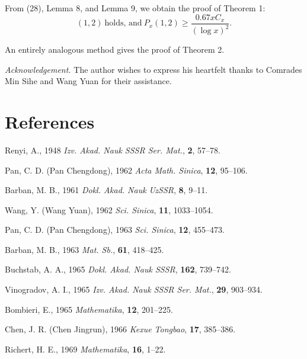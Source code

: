 From (28), Lemma 8, and Lemma 9, we obtain the proof of Theorem 1:
\[
(1,2)\ \text{holds, and}\ P_x(1,2)\geqslant\frac{0.67xC_x}{(\log x)^2}.
\]

An entirely analogous method gives the proof of Theorem 2.

\bigskip
\noindent\textit{Acknowledgement.} The author wishes to express his heartfelt thanks to Comrades Min Sihe and Wang Yuan for their assistance.

\section*{References}

\begin{enumerate}[leftmargin=2.5em,label={[\arabic*]}]
\item Renyi, A., 1948 \textit{Izv. Akad. Nauk SSSR Ser. Mat.}, \textbf{2}, 57--78.
\item Pan, C. D. (Pan Chengdong), 1962 \textit{Acta Math. Sinica}, \textbf{12}, 95--106.
\item Barban, M. B., 1961 \textit{Dokl. Akad. Nauk UzSSR}, \textbf{8}, 9--11.
\item Wang, Y. (Wang Yuan), 1962 \textit{Sci. Sinica}, \textbf{11}, 1033--1054.
\item Pan, C. D. (Pan Chengdong), 1963 \textit{Sci. Sinica}, \textbf{12}, 455--473.
\item Barban, M. B., 1963 \textit{Mat. Sb.}, \textbf{61}, 418--425.
\item Buchstab, A. A., 1965 \textit{Dokl. Akad. Nauk SSSR}, \textbf{162}, 739--742.
\item Vinogradov, A. I., 1965 \textit{Izv. Akad. Nauk SSSR Ser. Mat.}, \textbf{29}, 903--934.
\item Bombieri, E., 1965 \textit{Mathematika}, \textbf{12}, 201--225.
\item Chen, J. R. (Chen Jingrun), 1966 \textit{Kexue Tongbao}, \textbf{17}, 385--386.
\item Richert, H. E., 1969 \textit{Mathematika}, \textbf{16}, 1--22.
\end{enumerate}
